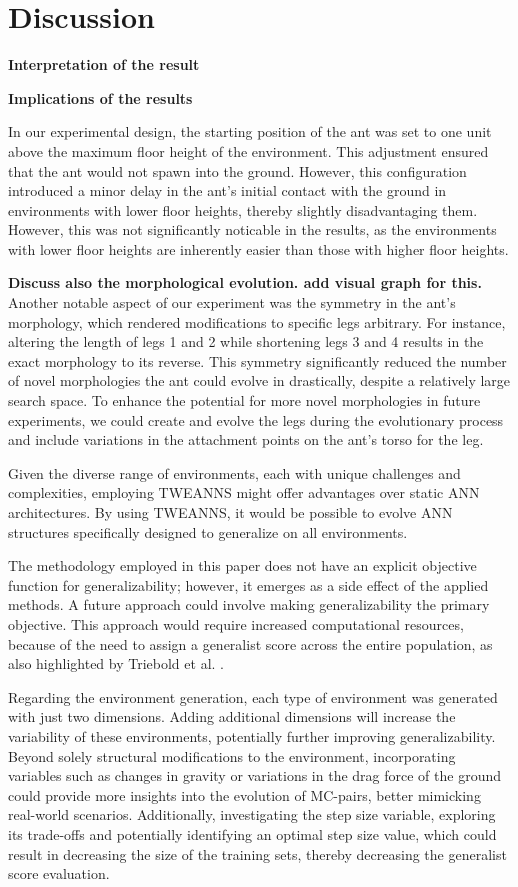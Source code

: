 \section{Discussion}

\textbf{Interpretation of the result}

\textbf{Implications of the results}

In our experimental design, the starting position of the ant was set to one unit above the maximum floor height of the environment. This adjustment ensured that the ant would not spawn into the ground. However, this configuration introduced a minor delay in the ant's initial contact with the ground in environments with lower floor heights, thereby slightly disadvantaging them. However, this was not significantly noticable in the results, as the environments with lower floor heights are inherently easier than those with higher floor heights.

\textbf{Discuss also the morphological evolution. add visual graph for this.}
Another notable aspect of our experiment was the symmetry in the ant's morphology, which rendered modifications to  specific legs arbitrary. For instance, altering the length of legs 1 and 2 while shortening legs 3 and 4 results in the exact morphology to its reverse. This symmetry significantly reduced the number of novel morphologies the ant could evolve in drastically, despite a relatively large search space. To enhance the potential for more novel morphologies in future experiments, we could create and evolve the legs during the evolutionary process and include variations in the attachment points on the ant's torso for the leg. 

Given the diverse range of environments, each with unique challenges and complexities, employing TWEANNS might offer advantages over static ANN architectures. By using TWEANNS, it would be possible to evolve ANN structures specifically designed to generalize on all environments.

The methodology employed in this paper does not have an explicit objective function for generalizability; however, it emerges as a side effect of the applied methods. A future approach could involve making generalizability the primary objective. This approach would require increased computational resources, because of the need to assign a generalist score across the entire population, as also highlighted by Triebold et al. \cite{Corinna_Triebold}.

Regarding the environment generation, each type of environment was generated with just two dimensions. Adding additional dimensions will increase the variability of these environments, potentially further improving generalizability. Beyond solely structural modifications to the environment, incorporating variables such as changes in gravity or variations in the drag force of the ground could provide more insights into the evolution of MC-pairs, better mimicking real-world scenarios. Additionally, investigating the step size variable, exploring its trade-offs and potentially identifying an optimal step size value, which could result in decreasing the size of the training sets, thereby decreasing the generalist score evaluation.